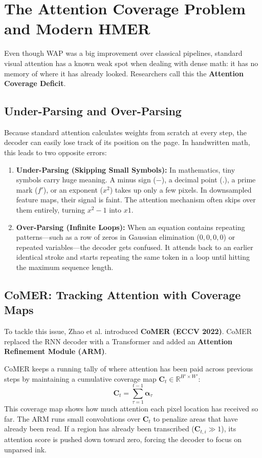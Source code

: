 \section{The Attention Coverage Problem and Modern HMER}
\label{sec:coverage_deficit}

Even though WAP was a big improvement over classical pipelines, standard visual attention has a known weak spot when dealing with dense math: it has no memory of where it has already looked. Researchers call this the \textbf{Attention Coverage Deficit}.

\subsection{Under-Parsing and Over-Parsing}
Because standard attention calculates weights from scratch at every step, the decoder can easily lose track of its position on the page. In handwritten math, this leads to two opposite errors:
\begin{enumerate}
    \item \textbf{Under-Parsing (Skipping Small Symbols):} In mathematics, tiny symbols carry huge meaning. A minus sign ($-$), a decimal point ($.$), a prime mark ($f'$), or an exponent ($x^2$) takes up only a few pixels. In downsampled feature maps, their signal is faint. The attention mechanism often skips over them entirely, turning $x^2 - 1$ into $x 1$.
    \item \textbf{Over-Parsing (Infinite Loops):} When an equation contains repeating patterns---such as a row of zeros in Gaussian elimination ($0, 0, 0, 0$) or repeated variables---the decoder gets confused. It attends back to an earlier identical stroke and starts repeating the same token in a loop until hitting the maximum sequence length.
\end{enumerate}

\subsection{CoMER: Tracking Attention with Coverage Maps}
To tackle this issue, Zhao et al. \cite{zhao2022comer} introduced \textbf{CoMER (ECCV 2022)}. CoMER replaced the RNN decoder with a Transformer and added an \textbf{Attention Refinement Module (ARM)}.

CoMER keeps a running tally of where attention has been paid across previous steps by maintaining a cumulative coverage map $\mathbf{C}_t \in \mathbb{R}^{H' \times W'}$:
\begin{equation}
\mathbf{C}_t = \sum_{\tau=1}^{t-1} \boldsymbol{\alpha}_\tau
\end{equation}
This coverage map shows how much attention each pixel location has received so far. The ARM runs small convolutions over $\mathbf{C}_t$ to penalize areas that have already been read. If a region has already been transcribed ($\mathbf{C}_{t, i} \gg 1$), its attention score is pushed down toward zero, forcing the decoder to focus on unparsed ink.


